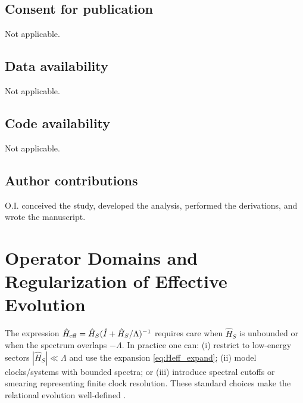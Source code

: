 \documentclass[11pt,a4paper]{article}
\theoremstyle{thmstyleone}
\theoremstyle{thmstyletwo}
\theoremstyle{thmstylethree}
\begin{document}
    \subsection*{Consent for publication}
        Not applicable.

    \subsection*{Data availability}
        Not applicable.

    \subsection*{Code availability}
        Not applicable.

    \subsection*{Author contributions}
        O.I. conceived the study, developed the analysis, performed the derivations, and wrote the manuscript.

        \appendix
    \section{Operator Domains and Regularization of Effective Evolution}\label{app:domains}
    The expression $\hat{H}_{\rm eff}=\hat{H}_S(\hat{I}+\hat{H}_S/\Lambda)^{-1}$ requires care when $\hat{H}_S$ is unbounded or when the spectrum overlaps $-\Lambda$. In practice one can: (i) restrict to low-energy sectors $|\hat{H}_S|\ll \Lambda$ and use the expansion \eqref{eq:Heff_expand}; (ii) model clocks/systems with bounded spectra; or (iii) introduce spectral cutoffs or smearing representing finite clock resolution. These standard choices make the relational evolution well-defined \cite{SinghFriedrich2025,PageWootters1983}.


    \newcommand{\swirlarrow}{\mathchoice{\mkern-2mu\scriptstyle\boldsymbol{\circlearrowleft}}%
    {\mkern-2mu\scriptstyle\boldsymbol{\circlearrowleft}}%
    {\mkern-2mu\scriptscriptstyle\boldsymbol{\circlearrowleft}}%
    {\mkern-2mu\scriptscriptstyle\boldsymbol{\circlearrowleft}}}
    \newcommand{\swirlarrowcw}{\mathchoice{\mkern-2mu\scriptstyle\boldsymbol{\circlearrowright}}%
    {\mkern-2mu\scriptstyle\boldsymbol{\circlearrowright}}%
    {\mkern-2mu\scriptscriptstyle\boldsymbol{\circlearrowright}}%
    {\mkern-2mu\scriptscriptstyle\boldsymbol{\circlearrowright}}}
\end{document}
